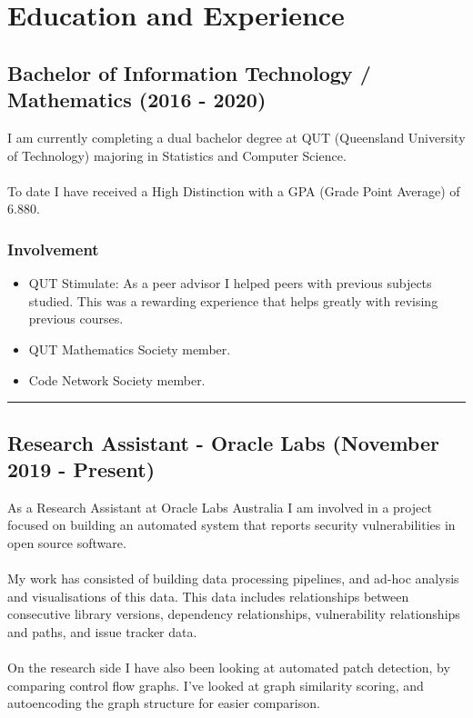 \section*{Education and Experience}
\subsection*{Bachelor of Information Technology / Mathematics (2016 - 2020)}

I am currently completing a dual bachelor degree at QUT (Queensland University of Technology) majoring in Statistics and Computer Science.\\
\\
To date I have received a High Distinction with a GPA (Grade Point Average) of 6.880.

\subsubsection*{Involvement}

\begin{itemize}
  \setlength\itemsep{0.1em}
  \item QUT Stimulate: As a peer advisor I helped peers with previous subjects studied. This was a rewarding experience that helps greatly with revising previous courses.
  \item QUT Mathematics Society member.
  \item Code Network Society member.
\end{itemize}

\noindent\rule{\textwidth}{0.5pt}

\subsection*{Research Assistant - Oracle Labs (November 2019 - Present)}

As a Research Assistant at Oracle Labs Australia I am involved in a project focused on building an automated system that reports security vulnerabilities in open source software.\\
\\
My work has consisted of building data processing pipelines, and ad-hoc analysis and visualisations of this data. This data includes relationships between consecutive library versions, dependency relationships, vulnerability relationships and paths, and issue tracker data.\\
\\
On the research side I have also been looking at automated patch detection, by comparing control flow graphs. I've looked at graph similarity scoring, and autoencoding the graph structure for easier comparison. 

